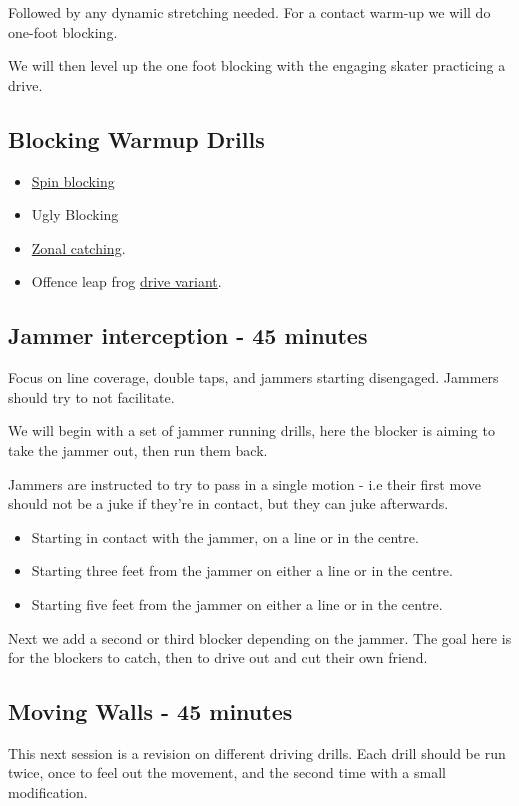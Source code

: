 \documentclass{journal}
\begin{document}
Followed by any dynamic stretching needed.
For a contact warm-up we will do one-foot blocking.

We will then level up the one foot blocking with the engaging skater practicing a drive. 


\subsection*{Blocking Warmup Drills}
\begin{itemize}
\item \hyperref[drill:one_on_one/developmental/spinning_blocking]{Spin blocking}
\item Ugly Blocking
\item \hyperref[drill:one_on_one/zonal_catching]{Zonal catching}.
\item Offence leap frog \hyperref[drill:drives/leap_frog]{drive variant}.
\end{itemize}

\subsection*{Jammer interception - 45 minutes}
Focus on line coverage, double taps, and jammers starting disengaged.
Jammers should try to not facilitate.


We will begin with a set of jammer running drills, here the blocker is aiming to take the jammer out, then run them back.

Jammers are instructed to try to pass in a single motion - i.e their first move should not be a juke if they're in contact, but they can juke afterwards.

\begin{itemize}
\item Starting in contact with the jammer, on a line or in the centre.
\item Starting three feet from the jammer on either a line or in the centre.
\item Starting five feet from the jammer on either a line or in the centre.
\end{itemize}


Next we add a second or third blocker depending on the jammer.
The goal here is for the blockers to catch, then to drive out and cut their own friend. 


\subsection*{Moving Walls - 45 minutes}
This next session is a revision on different driving drills.
Each drill should be run twice, once to feel out the movement, and the second time with a small modification.
\end{document}
